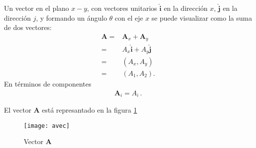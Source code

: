 \begin{frame}
Un vector en el plano $x-y$, con vectores unitarios $\hat{\mathbf{i}}$ en la direcci\'on $x$, $\hat{\mathbf{j}}$ en la direcci\'on $j$, y  formando un \'angulo $\theta$ con el eje $x$ se puede visualizar como la suma de dos vectores:
\begin{align}
  \mathbf{A}=&\mathbf{A}_x+\mathbf{A}_y\nonumber\\
            =&A_x\hat{\mathbf{i}}+A_y\hat{\mathbf{j}}\nonumber\\
            =&(A_x,A_y)\nonumber\\
            =&(A_1,A_2).
\end{align}
En t\'erminos de componentes
\begin{align}
  \mathbf{A}_i=A_i\,.
\end{align}

El vector $\mathbf{A}$ está represantado en la figura \ref{fig:avec}
\begin{figure}
  \centering
  \texttt{[image: avec]}
  \caption{Vector $\mathbf{A}$}
\label{fig:avec}
\end{figure}



\end{frame}
